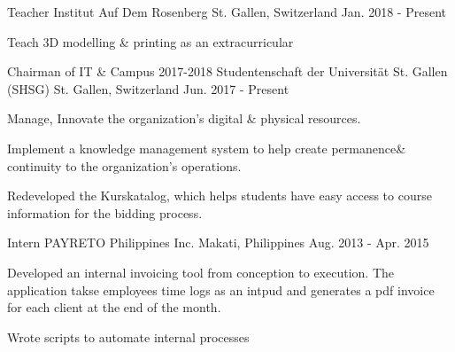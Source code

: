 

\begin{cventries}

  \cventry
    {Teacher} %
    {Institut Auf Dem Rosenberg} %
    {St. Gallen, Switzerland} %
    {Jan. 2018 - Present} %
    {
      \begin{cvitems} %
        \item {Teach 3D modelling \& printing as an extracurricular}
      \end{cvitems}
    }
  \cventry
    {Chairman of IT \& Campus 2017-2018} %
    {Studentenschaft der Universität St. Gallen (SHSG)} %
    {St. Gallen, Switzerland} %
    {Jun. 2017 - Present} %
    {
      \begin{cvitems} %
        \item {Manage, Innovate the organization's digital \& physical resources.}
        \item {Implement a knowledge management system to help create permanence\& continuity to the organization's operations.}
        \item {Redeveloped the Kurskatalog, which helps students have easy access to course information for the bidding process.}
      \end{cvitems}
    }
  \cventry
    {Intern} %
    {PAYRETO Philippines Inc.} %
    {Makati, Philippines} %
    {Aug. 2013 - Apr. 2015} %
    {
      \begin{cvitems} %
        \item {Developed an internal invoicing tool from conception to execution. The application takse employees time logs as an intpud and generates a pdf invoice for each client at the end of the month.}
        \item {Wrote scripts to automate internal processes}

\end{cvitems}}
\end{cventries}
